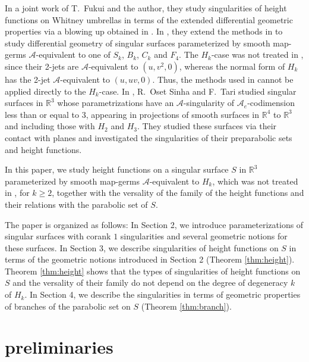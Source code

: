 \documentclass[12pt]{amsart}
\theoremstyle{plain}
\theoremstyle{definition}
\newcommand{\R}{\mathbb{R}}
\renewcommand{\geq}{\geqslant}
\begin{document}
In a joint work \cite{FH2013} of T.~Fukui and the author, they study singularities of height functions on Whitney umbrellas in terms of the extended differential geometric properties via a blowing up obtained in \cite{FH2012}.
In \cite{FH2025-2, FH2025}, they extend the methods in \cite{FH2012,FH2013} to study differential geometry of singular surfaces parameterized by smooth map-germs $\mathcal{A}$-equivalent to one of $S_k$, $B_k$, $C_k$ and $F_4$. 
The $H_k$-case was not treated in \cite{FH2025-2,FH2025}, since their 2-jets are $\mathcal{A}$-equivalent to $(u,v^2,0)$, whereas the normal form of $H_k$ has the 2-jet $\mathcal{A}$-equivalent to $(u,uv,0)$. 
Thus, the methods used in \cite{FH2025-2,FH2025} cannot be applied directly to the $H_k$-case.
In \cite{O-ST2015}, R.~Oset Sinha and F.~Tari studied singular surfaces in $\R^3$ whose parametrizations have an $\mathcal{A}$-singularity of $\mathcal{A}_e$-codimension less than or equal to $3$, appearing in projections of smooth surfaces in $\R^4$ to $\R^3$ and including those with $H_2$ and $H_3$. 
They studied these surfaces via their contact with planes and investigated the singularities of their preparabolic sets and height functions.

In this paper, we study height functions on a singular surface $S$ in $\R^3$ parameterized by smooth map-germs $\mathcal{A}$-equivalent to $H_k$, which was not treated in \cite{FH2025}, for $k\geq 2$, together with the versality of the family of the height functions and their relations with the parabolic set of $S$.

The paper is organized as follows:
In Section 2, we introduce parameterizations of singular surfaces with corank $1$ singularities and several geometric notions for these surfaces.
In Section 3, we describe singularities of height functions on $S$ in terms of the geometric notions introduced in Section 2 (Theorem \ref{thm:height}).
Theorem \ref{thm:height} shows that the types of singularities of height functions on $S$ and the versality of their family do not depend on the degree of degeneracy $k$ of $H_k$.
In Section 4, we describe the singularities in terms of geometric properties of branches of the parabolic set on $S$ (Theorem \ref{thm:branch}).

\section{preliminaries}
\end{document}
